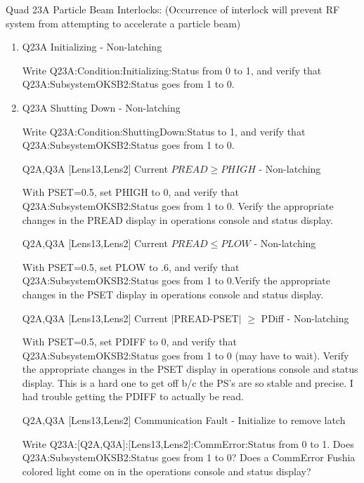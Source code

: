 \documentclass[11pt]{book}		%
\begin{document}
Quad 23A Particle Beam Interlocks:
(Occurrence of interlock will prevent RF system from attempting to accelerate a particle beam)

\begin{enumerate}
 \item Q23A Initializing - Non-latching

\color{red}
Write Q23A:Condition:Initializing:Status from 0 to 1, and verify that Q23A:SubsystemOKSB2:Status goes from 1 to 0.
\color{black}

 \item Q23A Shutting Down - Non-latching

\color{red}
Write Q23A:Condition:ShuttingDown:Status to 1, and verify that Q23A:SubsystemOKSB2:Status goes from 1 to 0.
\color{black}


 \item [Q2A,Q3A] [Lens13,Lens2] Current $PREAD \geq PHIGH$ - Non-latching

\color{red}
With PSET=0.5, set PHIGH to 0, and verify that Q23A:SubsystemOKSB2:Status goes from 1 to 0. Verify the appropriate changes in the PREAD display in operations console and status display.
\color{black}

 \item [Q2A,Q3A] [Lens13,Lens2] Current $PREAD \leq PLOW$ - Non-latching

\color{red}
With PSET=0.5, set PLOW to .6, and verify that Q23A:SubsystemOKSB2:Status goes from 1 to 0.Verify the appropriate changes in the PSET display in operations console and status display.
\color{black}

 \item [Q2A,Q3A] [Lens13,Lens2] Current $\mid$PREAD-PSET$\mid$  $\geq$ PDiff - Non-latching

\color{red}
With PSET=0.5, set PDIFF to 0, and verify that Q23A:SubsystemOKSB2:Status goes from 1 to 0 (may have to wait). Verify the appropriate changes in the PSET display in operations console and status display. This is a hard one to get off b/c the PS's are so stable and precise. I had trouble getting the PDIFF to actually be read.
\color{black}

 \item [Q2A,Q3A] [Lens13,Lens2] Communication Fault - Initialize to remove latch

\color{red}
Write Q23A:[Q2A,Q3A]:[Lens13,Lens2]:CommError:Status from 0 to 1. Does Q23A:SubsystemOKSB2:Status goes from 1 to 0? Does a CommError Fushia colored light come on in the operations console and status display?
\color{black}


\end{enumerate}
\end{document}
